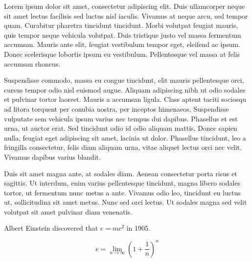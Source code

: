 \documentclass[11pt,a4paper,sans]{moderncv}        %
\begin{document}
Lorem ipsum dolor sit amet, consectetur adipiscing elit. Duis ullamcorper neque sit amet lectus facilisis sed luctus nisl iaculis. Vivamus at neque arcu, sed tempor quam. Curabitur pharetra tincidunt tincidunt. Morbi volutpat feugiat mauris, quis tempor neque vehicula volutpat. Duis tristique justo vel massa fermentum accumsan. Mauris ante elit, feugiat vestibulum tempor eget, eleifend ac ipsum. Donec scelerisque lobortis ipsum eu vestibulum. Pellentesque vel massa at felis accumsan rhoncus.

Suspendisse commodo, massa eu congue tincidunt, elit mauris pellentesque orci, cursus tempor odio nisl euismod augue. Aliquam adipiscing nibh ut odio sodales et pulvinar tortor laoreet. Mauris a accumsan ligula. Class aptent taciti sociosqu ad litora torquent per conubia nostra, per inceptos himenaeos. Suspendisse vulputate sem vehicula ipsum varius nec tempus dui dapibus. Phasellus et est urna, ut auctor erat. Sed tincidunt odio id odio aliquam mattis. Donec sapien nulla, feugiat eget adipiscing sit amet, lacinia ut dolor. Phasellus tincidunt, leo a fringilla consectetur, felis diam aliquam urna, vitae aliquet lectus orci nec velit. Vivamus dapibus varius blandit.

Duis sit amet magna ante, at sodales diam. Aenean consectetur porta risus et sagittis. Ut interdum, enim varius pellentesque tincidunt, magna libero sodales tortor, ut fermentum nunc metus a ante. Vivamus odio leo, tincidunt eu luctus ut, sollicitudina sit amet metus. Nunc sed orci lectus. Ut sodales magna sed velit volutpat sit amet pulvinar diam venenatis.

Albert Einstein discovered that $e=mc^2$ in 1905.

\[ e=\lim_{n \to \infty} \left(1+\frac{1}{n}\right)^n \]

\makeletterclosing

\end{document}
